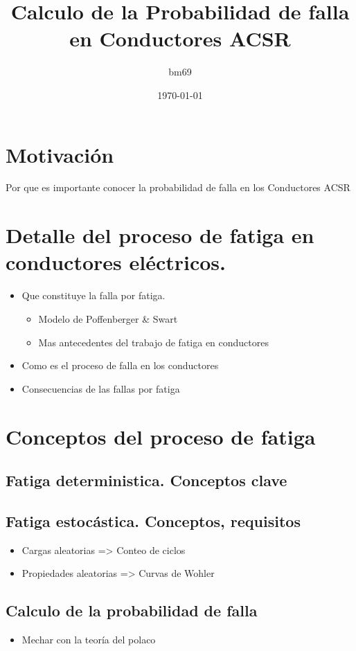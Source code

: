 \documentclass[11pt]{article}
\author{bm69}
\date{\today}
\title{Calculo de la Probabilidad de falla en Conductores ACSR}
\begin{document}
\maketitle
\tableofcontents

\section{Motivación}
\label{sec:org7ad283e}
Por que es importante conocer la probabilidad de falla en los Conductores ACSR
\section{Detalle del proceso de fatiga en conductores eléctricos.}
\label{sec:org696e3d5}
\begin{itemize}
\item Que constituye la falla por fatiga.
\begin{itemize}
\item Modelo de Poffenberger \& Swart
\item Mas antecedentes del trabajo de fatiga en conductores
\end{itemize}
\item Como es el proceso de falla en los conductores
\item Consecuencias de las fallas por fatiga
\end{itemize}
\section{Conceptos del proceso de fatiga}
\label{sec:orgf971f1f}
\subsection{Fatiga deterministica. Conceptos clave}
\label{sec:org27b104f}
\subsection{Fatiga estocástica. Conceptos, requisitos}
\label{sec:orgb54aa2d}
\begin{itemize}
\item Cargas aleatorias => Conteo de ciclos
\item Propiedades aleatorias => Curvas de Wohler
\end{itemize}
\subsection{Calculo de la probabilidad de falla}
\label{sec:org4f1d813}
\begin{itemize}
\item Mechar con la teoría del polaco
\end{itemize}
\end{document}
